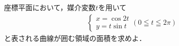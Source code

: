 \documentclass[../../main.tex]{subfiles}
\begin{document}
座標平面において，媒介変数$t$を用いて
\begin{align*}
  \begin{cases} x=\cos 2t \\ y=t\sin t
  \end{cases} (0 \leqq t \leqq 2\pi)
\end{align*}
と表される曲線が囲む領域の面積を求めよ．
\end{document}
